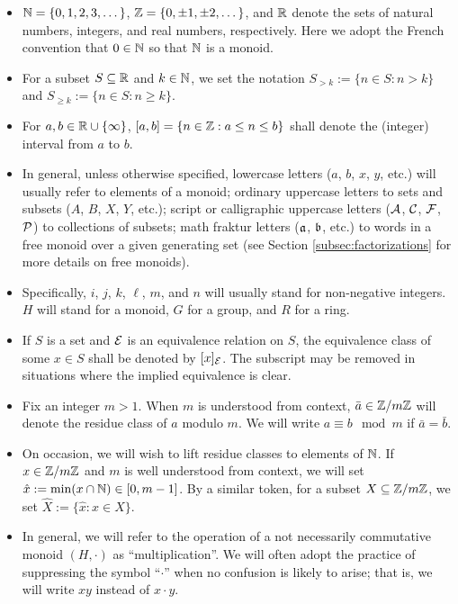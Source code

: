 \begin{itemize}
	\item $\NN = \{0,1,2,3,\dots\}$, $\ZZ = \{0,\pm 1, \pm 2,\dots\}$, and $\RR$ denote the sets of natural numbers, integers, and real numbers, respectively.
	Here we adopt the French convention that $0\in \NN$ so that $\NN$ is a monoid.
	
	\item For a subset $S\subseteq \RR$ and $k\in \NN$, we set the notation $S_{>k} := \{n\in S: n>k\}$ and $S_{\ge k} := \{n\in S: n\ge k\}$.
	
	\item For $a, b\in \RR\cup\{\infty\}$, $[ a,b ] = \{ n\in \ZZ : a \le n \le b \}$ shall denote the (integer) interval from $a$ to $b$.
	
	\item In general, unless otherwise specified, lowercase letters ($a$, $b$, $x$, $y$, etc.) will usually refer to elements of a monoid; ordinary uppercase letters to sets and subsets ($A$, $B$, $X$, $Y$, etc.); script or calligraphic uppercase letters ($\A$, $\C$, $\F$, $\P$) to collections of subsets; math fraktur letters ($\aa$, $\bb$, etc.) to words in a free monoid over a given generating set (see Section \ref{subsec:factorizations} for more details on free monoids).
	
	\item Specifically, $i$, $j$, $k$, $\ell$, $m$, and $n$ will usually stand for non-negative integers. 
	$H$ will stand for a monoid, $G$ for a group, and $R$ for a ring.
	
	\item If $S$ is a set and $\E$ is an equivalence relation on $S$, the equivalence class of some $x\in S$ shall be denoted by $[x]_\E$.
	The subscript may be removed in situations where the implied equivalence is clear.
	
	\item Fix an integer $m>1$.  When $m$ is understood from context, $\bar{a} \in \ZZ/m\ZZ$ will denote the residue class of $a$ modulo $m$.
	We will write $a\equiv b \mod m$ if $\bar{a} = \bar{b}$.
	
	\item On occasion, we will wish to lift residue classes to elements of $\NN$.  
	If $x\in \ZZ/m\ZZ$ and $m$ is well understood from context, we will set $\hat{x} := \min(x\cap \NN) \in [0,m-1]$.
	By a similar token, for a subset $X\subseteq \ZZ/m\ZZ$, we set $\hat{X} := \{\hat{x}: x\in X\}$.
	
	\item In general, we will refer to the operation of a not necessarily commutative monoid $(H,\cdot)$ as ``multiplication''.
	We will often adopt the practice of suppressing the symbol ``$\cdot$'' when no confusion is likely to arise; that is, we will write $xy$ instead of $x\cdot y$.
	

\end{itemize}
